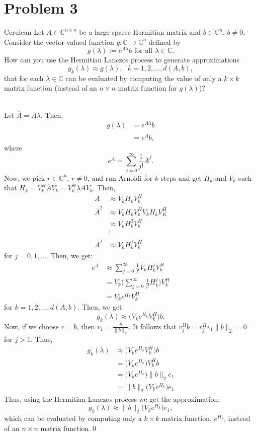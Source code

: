 \documentclass[12pt]{article}
\def\C{\mathbb{C}}
\begin{document}
\newpage
\section{Problem 3} 
\begin{mybox}{Cerulean}{}
Let $A\in \C^{n\times n}$ be a large sparse Hermitian matrix and $b\in \C^n$, $b\neq 0$.  Consider the vector-valued function $g: \C \to \C^n$ defined by 
$$g(\lambda) := e^{A\lambda}b \text{ for all } \lambda\in\C.$$
How can you use the Hermitian Lanczos process to generate approximations
$$g_k(\lambda) \approx g(\lambda), \text{ } k=1,2,\dots, d(A,b),$$
that for each $\lambda \in\C$ can be evaluated by computing the value of only a $k\times k$ matrix function (instead of an $n\times n$ matrix function for $g(\lambda)$)?
\end{mybox}
\text{ }\\

\noindent
Let $\overline{A} = A\lambda$.  Then,
\begin{align*}
g(\lambda) &= e^{A\lambda}b \\
&= e^{\overline{A}}b,
\end{align*}
where
$$e^{\overline{A}} = \sum\limits_{j=0}^\infty \frac{1}{j!}\overline{A}^j.$$
Now, we pick $r\in\C^n$, $r\neq 0$, and run Arnoldi for $k$ steps and get $H_k$ and $V_k$ such that $H_k = V_k^H\overline{A}V_k = V_k^H\lambda A V_k$.  Then,
\begin{align*}
\overline{A} &\approx V_kH_kV_k^H \\
\overline{A}^2 &\approx V_kH_kV_k^HV_kH_kV_K^H \\
&\approx V_kH_k^2V_k^H \\
&\vdots \\
\overline{A}^j &\approx V_kH_k^jV_k^H
\end{align*}
for $j=0,1,\dots $.  Then, we get:
\begin{align*}
e^{\overline{A}} &\approx \sum\limits_{j=0}^\infty \frac{1}{j!}V_kH_k^jV_k^H \\
&= V_k\bigg(\sum\limits_{j=0}^\infty \frac{1}{j!}H_k^j\bigg)V_k^H \\
&= V_k e^{H_k}V_k^H
\end{align*}
for $k=1,2,\dots, d(A,b)$.  Then, we get
$$g_k(\lambda) \approx \big(V_k e^{H_k}V_k^H\big)b.$$
Now, if we choose $r = b$, then $v_1 = \frac{b}{\|b\|_2}$.  It follows that $v_j^Hb = v_j^Hv_1\|b\|_2 = 0$ for $j > 1$.  Thus,
\begin{align*}
g_k(\lambda) &\approx \big(V_k e^{H_k}V_k^H\big)b \\
&= \big(V_k e^{H_k}\big)V_k^Hb \\
&= \big(V_k e^{H_k}\big)\|b\|_2 e_1 \\
&= \|b\|_2\big(V_k e^{H_k}\big)e_1
\end{align*}
Thus, using the Hermitian Lanczos process we get the approximation:
$$g_k(\lambda) \approx \|b\|_2\big(V_k e^{H_k}\big)e_1,$$
which can be evaluated by computing only a $k\times k$ matrix function, $e^{H_k}$, instead of an $n\times n$ matrix function.\qed\\
\end{document}
